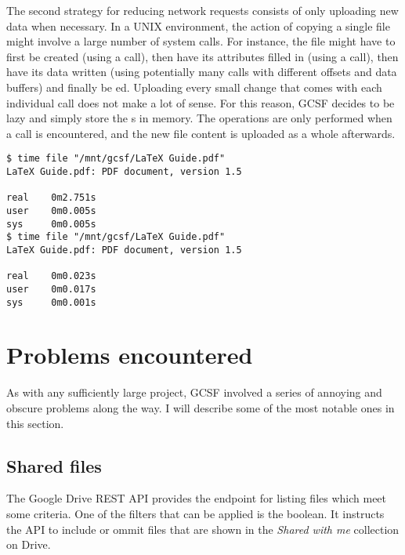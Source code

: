 The second strategy for reducing network requests consists of only uploading new data when necessary. In a UNIX environment, the action of copying a single file might involve a large number of system calls. For instance, the file might have to first be created (using a  call), then have its attributes filled in (using a  call), then have its data written (using potentially many  calls with different offsets and data buffers) and finally be ed. Uploading every small change that comes with each individual  call does not make a lot of sense. For this reason, GCSF decides to be lazy and simply store the s in memory. The operations are only performed when a  call is encountered, and the new file content is uploaded as a whole afterwards.


\begin{lstlisting}[basicstyle=\footnotesize\ttfamily,float,caption=File caching, frame=single, label=file_caching]
$ time file "/mnt/gcsf/LaTeX Guide.pdf"
LaTeX Guide.pdf: PDF document, version 1.5

real    0m2.751s
user    0m0.005s
sys     0m0.005s
$ time file "/mnt/gcsf/LaTeX Guide.pdf"
LaTeX Guide.pdf: PDF document, version 1.5

real    0m0.023s
user    0m0.017s
sys     0m0.001s
\end{lstlisting}

\section{Problems encountered} \label{problems_encountered}

As with any sufficiently large project, GCSF involved a series of annoying and obscure problems along the way. I will describe some of the most notable ones in this section.

\subsection{Shared files} \label{shared_files}

The Google Drive REST API provides the  endpoint\cite{files_list_call} for listing files which meet some criteria. One of the filters that can be applied is the  boolean. It instructs the API to include or ommit files that are shown in the \emph{Shared with me} collection on Drive.

